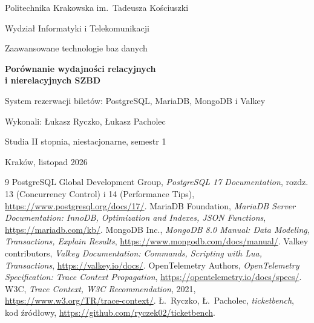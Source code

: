 \documentclass[11pt,a4paper]{article}
\begin{document}
\begin{titlepage}
  \centering
  {\large Politechnika Krakowska im.~Tadeusza Kościuszki\par}
  {\large Wydział Informatyki i Telekomunikacji\par}
  \vspace{3cm}
  {\Large Zaawansowane technologie baz danych\par}
  \vspace{1.2cm}
  {\huge\bfseries Porównanie wydajności relacyjnych\\[4pt] i nierelacyjnych SZBD\par}
  \vspace{0.6cm}
  {\Large System rezerwacji biletów: PostgreSQL, MariaDB, MongoDB i Valkey\par}
  \vfill
  {\large Wykonali: Łukasz Ryczko, Łukasz Pacholec\par}
  \vspace{0.4cm}
  {\large Studia II stopnia, niestacjonarne, semestr 1\par}
  \vspace{1.5cm}
  {\large Kraków, listopad 2026\par}
\end{titlepage}

\tableofcontents
\newpage













\appendix


\begin{thebibliography}{9}
 PostgreSQL Global Development Group, \emph{PostgreSQL 17 Documentation}, rozdz. 13 (Concurrency Control) i 14 (Performance Tips), \url{https://www.postgresql.org/docs/17/}.
 MariaDB Foundation, \emph{MariaDB Server Documentation: InnoDB, Optimization and Indexes, JSON Functions}, \url{https://mariadb.com/kb/}.
 MongoDB Inc., \emph{MongoDB 8.0 Manual: Data Modeling, Transactions, Explain Results}, \url{https://www.mongodb.com/docs/manual/}.
 Valkey contributors, \emph{Valkey Documentation: Commands, Scripting with Lua, Transactions}, \url{https://valkey.io/docs/}.
 OpenTelemetry Authors, \emph{OpenTelemetry Specification: Trace Context Propagation}, \url{https://opentelemetry.io/docs/specs/}.
 W3C, \emph{Trace Context, W3C Recommendation}, 2021, \url{https://www.w3.org/TR/trace-context/}.
 Ł.~Ryczko, Ł.~Pacholec, \emph{ticketbench}, kod źródłowy, \url{https://github.com/ryczek02/ticketbench}.
\end{thebibliography}
\end{document}
